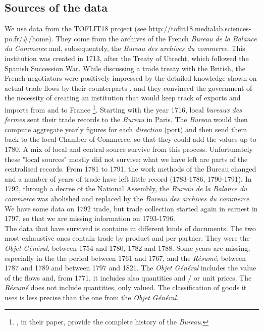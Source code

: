 \documentclass[12pt,a4paper,notitlepage,english]{article}
\begin{document}
\subsection{Sources of the data} \label{sources_of_data}
We use data from the TOFLIT18 project (see http://toflit18.medialab.sciences-po.fr/\#/home). They come from the archives of the French \textit{Bureau de la Balance du Commerce} and, subsequentely, the \textit{Bureau des archives du commerce}.
This institution was created in 1713, after the Treaty of Utrecht, which followed the Spanish Succession War.
While discussing a trade treaty with the British, the French negotiators were positively impressed by the detailed knowledge shown on actual trade flows by their counterparts , and they convinced the government of the necessity of creating an institution that would keep track of exports and imports from and to France \citep{charles2011collecte}\footnote{\cite{charles2011collecte}, in their paper, provide the complete history of the \textit{Bureau}.}.
Starting with the year 1716, local \textit{bureaux des fermes} sent their trade records to the \textit{Bureau} in Paris.
The \textit{Bureau} would then compute aggregate yearly figures for each \textit{direction} (port) and then send them back to the local Chamber of Commerce, so that they could add the values up to 1780.
A mix of local and central source survive from this process. Unfortunately these "local sources" mostly did not survive; what we have left are parts of the centralised records.
From 1781 to 1791, the work methods of the Bureau changed and a number of years of trade have left little record (1783-1786, 1790-1791).
In 1792, through a decree of the National Assembly, the \textit{Bureau de la Balance du commerce} was abolished and replaced by the \textit{Bureau des archives du commerce}. We have some data on 1792 trade, but trade collection started again in earnest in 1797, so that we are missing information on 1793-1796.\\
The data that have survived is containe in different kinds of documents.
The two most exhaustive ones contain trade by product and per partner. They were the \textit{Objet Général}, between 1754 and 1780, 1782 and 1788. Some years are missing, especially in the the period between 1761 and 1767, and the \textit{Résumé}, between 1787 and 1789 and between 1797 and 1821.
The \textit{Objet Général }includes the value of the flows and, from 1771, it includes also quantities and / or unit prices.
The \textit{Résumé} does not include quantities, only valued. The classification of goods it uses is less precise than the one from the \textit{Objet Général}.
\end{document}
